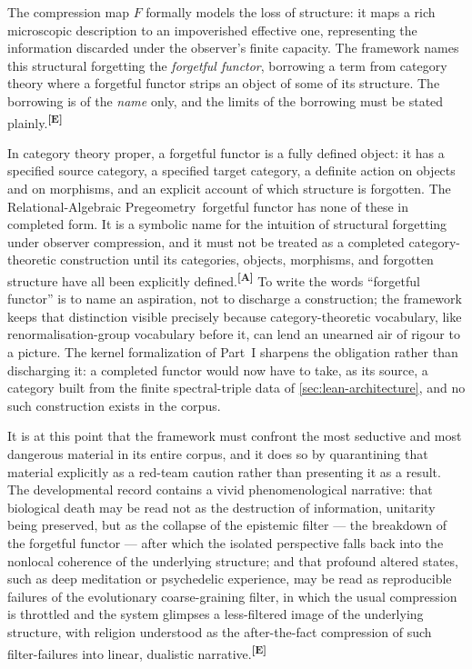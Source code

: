 \documentclass[12pt,a4paper,twoside]{article}
\theoremstyle{plain}
\theoremstyle{definition}
\theoremstyle{remark}
\newcommand{\ProjectShort}{Relational-Algebraic Pregeometry}
\newcommand{\RAP}{\ProjectShort}
\newcommand{\catmark}[1]{\textsuperscript{\textsf{\textbf{[#1]}}}}
\begin{document}
The compression map $F$ formally models the loss of structure: it maps a
rich microscopic description to an impoverished effective one,
representing the information discarded under the observer's finite
capacity. The framework names this structural forgetting the
\emph{forgetful functor}, borrowing a term from category theory where a
forgetful functor strips an object of some of its structure. The
borrowing is of the \emph{name} only, and the limits of the borrowing
must be stated plainly.\catmark{E}

In category theory proper, a forgetful functor is a fully defined
object: it has a specified source category, a specified target category,
a definite action on objects and on morphisms, and an explicit account
of which structure is forgotten. The \RAP\ forgetful functor has none
of these in completed form. It is a symbolic name for the intuition of
structural forgetting under observer compression, and it must not be
treated as a completed category-theoretic construction until its
categories, objects, morphisms, and forgotten structure have all been
explicitly defined.\catmark{A} To write the words ``forgetful functor''
is to name an aspiration, not to discharge a construction; the framework
keeps that distinction visible precisely because category-theoretic
vocabulary, like renormalisation-group vocabulary before it, can lend an
unearned air of rigour to a picture. The kernel formalization of Part~I
sharpens the obligation rather than discharging it: a completed functor
would now have to take, as its source, a category built from the finite
spectral-triple data of \cref{sec:lean-architecture}, and no such
construction exists in the corpus.

It is at this point that the framework must confront the most seductive
and most dangerous material in its entire corpus, and it does so by
quarantining that material explicitly as a red-team caution rather than
presenting it as a result. The developmental record contains a vivid
phenomenological narrative: that biological death may be read not as the
destruction of information, unitarity being preserved, but as the
collapse of the epistemic filter --- the breakdown of the forgetful
functor --- after which the isolated perspective falls back into the
nonlocal coherence of the underlying structure; and that profound
altered states, such as deep meditation or psychedelic experience, may
be read as reproducible failures of the evolutionary coarse-graining
filter, in which the usual compression is throttled and the system
glimpses a less-filtered image of the underlying structure, with
religion understood as the after-the-fact compression of such
filter-failures into linear, dualistic narrative.\catmark{E}
\end{document}
